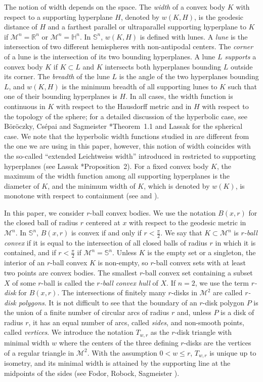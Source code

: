 \documentclass[12pt,reqno]{amsart}
\theoremstyle{remark}
\newcommand{\R}{{\mathbb R}}
\newcommand{\hyp}{{\mathbb H}}
\newcommand{\sph}{{\mathbb S}}
\newcommand{\M}{\mathcal{M}}
\begin{document}
The notion of width depends on the space. 
The \emph{width} of a convex body $K$ with respect to a supporting hyperplane $H$, denoted by $w(K,H)$, is the geodesic distance of $H$ and a farthest parallel or ultraparallel supporting hyperplane to $K$ if $\M^n=\R^n$ or $\M^n=\hyp^n$. In $\sph^n$, $w(K,H)$ is defined with lunes. A \emph{lune} is the intersection of two different hemispheres with non-antipodal centers. The \emph{corner} of a lune is the intersection of its two bounding hyperplanes. A lune $L$ \emph{supports} a convex body $K$ if $K\subset L$ and $K$ intersects both hyperplanes bounding $L$ outside its corner. The \emph{breadth} of the lune $L$ is the angle of the two hyperplanes bounding $L$, and $w(K,H)$ is the minimum breadth of all supporting lunes to $K$ such that one of their bounding hyperplanes is $H$. In all cases, the width function is continuous in $K$ with respect to the Hausdorff metric and in $H$ with respect to the topology of the sphere; for a detailed discussion of the hyperbolic case, see B\"or\"oczky, Cs\'epai and Sagmeister \cite{BoCsS}*{Theorem~1.1} and Lassak \cite{La15} for the spherical case. We note that the hyperbolic width functions studied in \cite{BoCsS} are different from the one we are using in this paper, however, this notion of width coincides with the so-called ``extended Leichtweiss width'' introduced in \cite{BoCsS} restricted to supporting hyperplanes (see Lassak \cite{Las23}*{Proposition~2}). For a fixed convex body $K$, the maximum of the width function among all supporting hyperplanes is the diameter of $K$, and the minimum width of $K$, which is denoted by $w(K)$, is monotone with respect to containment (see \cite{La15} and \cite{Las23}).

In this paper, we consider $r$-ball convex bodies. We use the notation $B(x,r)$ for the closed ball of radius $r$ centered at $x$ with respect to the geodesic metric in $\M^n$. In $\sph^n$, $B(x,r)$ is convex if and only if $r<\tfrac{\pi}{2}$. We say that $K\subset\M^n$ is \emph{$r$-ball convex} if it is equal to the intersection of all closed balls of radius $r$ in which it is contained, and if $r<\tfrac{\pi}{2}$ if $\M^n=\sph^n$. Unless $K$ is the empty set or a singleton, the interior of an $r$-ball convex $K$ is non-empty, so $r$-ball convex sets with at least two points are convex bodies. The smallest $r$-ball convex set containing a subset $X$ of some $r$-ball is called the \emph{$r$-ball convex hull} of $X$. If $n=2$, we use the term \emph{$r$-disk} for $B(x,r)$.
The intersections of finitely many $r$-disks in $\M^2$ are called \emph{$r$-disk polygons}. It is not difficult to see that the boundary of an $r$-disk polygon $P$ is the union of a finite number of circular arcs of radius $r$ and, unless $P$ is a disk of radius $r$, it has an equal number of arcs, called \emph{sides}, and non-smooth points, called \emph{vertices}. We introduce the notation $T_{w,r}$ as the $r$-disk triangle with minimal width $w$ where the centers of the three defining $r$-disks are the vertices of a regular triangle in $\M^2$. With the assumption $0<w\leq r$, $T_{w,r}$ is unique up to isometry, and its minimal width is attained by the supporting line at the midpoints of the sides (see Fodor, Robock, Sagmeister \cite{FRS26}).
\end{document}
